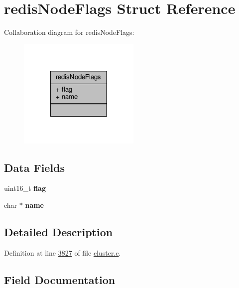\hypertarget{structredisNodeFlags}{}\section{redis\+Node\+Flags Struct Reference}
\label{structredisNodeFlags}


Collaboration diagram for redis\+Node\+Flags\+:\nopagebreak
\begin{figure}[H]
\begin{center}
\leavevmode
\includegraphics[width=165pt]{structredisNodeFlags__coll__graph}
\end{center}
\end{figure}
\subsection*{Data Fields}
\begin{DoxyCompactItemize}
\item 
\mbox{\label{structredisNodeFlags_a3bdafe32c2c207c4ead201b1053b152f}} 
uint16\+\_\+t {\bfseries flag}
\item 
\mbox{\label{structredisNodeFlags_a470e406fdd288c7432fdbe9843867ba8}} 
char $\ast$ {\bfseries name}
\end{DoxyCompactItemize}


\subsection{Detailed Description}


Definition at line \hyperlink{cluster_8c_source_l03827}{3827} of file \hyperlink{cluster_8c_source}{cluster.\+c}.



\subsection{Field Documentation}
\mbox{\label{structredisNodeFlags_a3bdafe32c2c207c4ead201b1053b152f}} 
